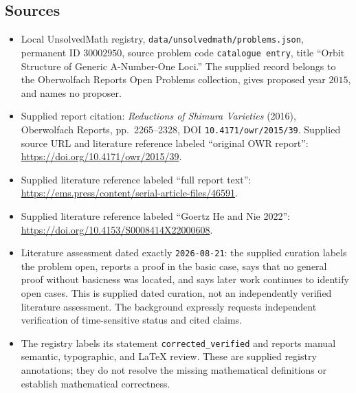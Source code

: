 \documentclass[11pt]{article}
\begin{document}
\subsection{Sources}
\begin{itemize}
\item Local UnsolvedMath registry, \texttt{data/unsolvedmath/problems.json}, permanent ID \(30002950\), source problem code \texttt{catalogue entry}, title ``Orbit Structure of Generic A-Number-One Loci.'' The supplied record belongs to the Oberwolfach Reports Open Problems collection, gives proposed year \(2015\), and names no proposer.
\item Supplied report citation: \emph{Reductions of Shimura Varieties} (2016), Oberwolfach Reports, pp.\ 2265--2328, DOI \texttt{10.4171/owr/2015/39}. Supplied source URL and literature reference labeled ``original OWR report'': \url{https://doi.org/10.4171/owr/2015/39}.
\item Supplied literature reference labeled ``full report text'': \url{https://ems.press/content/serial-article-files/46591}.
\item Supplied literature reference labeled ``Goertz He and Nie 2022'': \url{https://doi.org/10.4153/S0008414X22000608}.
\item Literature assessment dated exactly \texttt{2026-08-21}: the supplied curation labels the problem open, reports a proof in the basic case, says that no general proof without basicness was located, and says later work continues to identify open cases. This is supplied dated curation, not an independently verified literature assessment. The background expressly requests independent verification of time-sensitive status and cited claims.
\item The registry labels its statement \texttt{corrected\_verified} and reports manual semantic, typographic, and LaTeX review. These are supplied registry annotations; they do not resolve the missing mathematical definitions or establish mathematical correctness.
\end{itemize}
\end{document}
